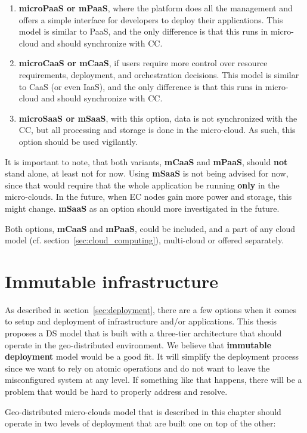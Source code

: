 \begin{enumerate}[start=1,label={(\bfseries \arabic*)}]
	\item \textbf{microPaaS or mPaaS}, where the platform does all the management and offers a simple interface for developers to deploy their applications. This model is similar to PaaS, and the only difference is that this runs in micro-cloud and should synchronize with CC.
	\item \textbf{microCaaS or mCaaS}, if users require more control over resource requirements, deployment, and orchestration decisions. This model is similar to CaaS (or even IaaS), and the only difference is that this runs in micro-cloud and should synchronize with CC.
	\item \textbf{microSaaS or mSaaS}, with this option, data is not synchronized with the CC, but all processing and storage is done in the micro-cloud. As such, this option should be used vigilantly.
\end{enumerate}

\noindent
It is important to note, that both variants, \textbf{mCaaS} and \textbf{mPaaS}, should \textbf{not} stand alone, at least not for now. Using \textbf{mSaaS} is not being advised for now, since that would require that the whole application be running \textbf{only} in the micro-clouds. In the future, when EC nodes gain more power and storage, this might change. \textbf{mSaaS} as an option should more investigated in the future.

Both options, \textbf{mCaaS} and \textbf{mPaaS}, could be included, and a part of any cloud model (cf. section~\ref{sec:cloud_computing}), multi-cloud or offered separately.
%
%
\section{Immutable infrastructure}\label{sec:immutable_infrastructure}
%
As described in section~\ref{sec:deployment}, there are a few options when it comes to setup and deployment of infrastructure and/or applications. This thesis proposes a DS model that is built with a three-tier architecture that should operate in the geo-distributed environment. We believe that \textbf{immutable deployment} model would be a good fit. It will simplify the deployment process since we want to rely on atomic operations and do not want to leave the misconfigured system at any level. If something like that happens, there will be a problem that would be hard to properly address and resolve.

Geo-distributed micro-clouds model that is described in this chapter should operate in two levels of deployment that are built one on top of the other:

